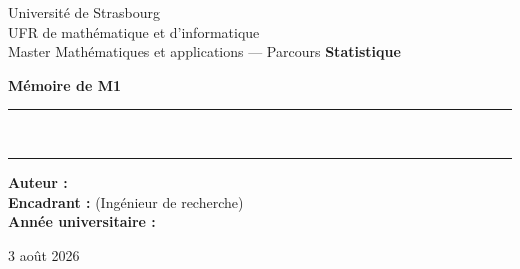 \begin{titlepage}
\centering
\vspace*{1cm}

{\large Université de Strasbourg \\[0.2cm]
UFR de mathématique et d'informatique \\[0.2cm]
Master Mathématiques et applications --- Parcours \textbf{Statistique}\par}

\vfill

{\Large\bfseries Mémoire de M1\par}
\vspace{0.8cm}
\rule{\linewidth}{0.4pt}\\[0.4cm]
{\huge\bfseries \titrememoire \par}
\vspace{0.4cm}
\rule{\linewidth}{0.4pt}

\vfill

\begin{flushleft}
\textbf{Auteur :} \auteur \\[0.3cm]
\textbf{Encadrant :} \encadrant{} (Ingénieur de recherche) \\[0.3cm]
\textbf{Année universitaire :} \anneeuniv
\end{flushleft}

\vfill
{\small 3 août 2026\par}
\end{titlepage}
